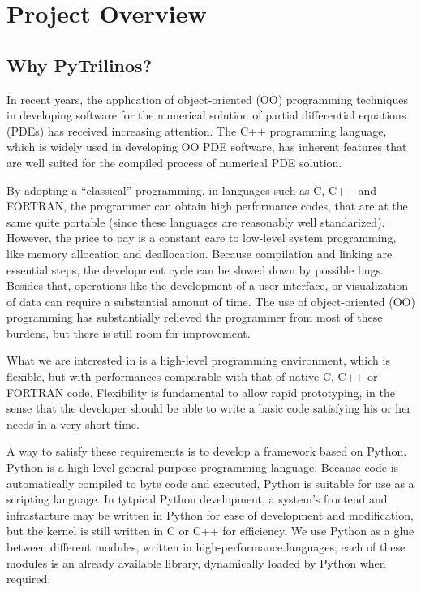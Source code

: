 \documentclass[10pt,relax]{SANDreport}
\newcommand{\PyTrilinos}{{PyTrilinos}}
\begin{document}
\section{Project Overview}
\label{sec:overview}

\subsection{Why \PyTrilinos?}
\label{sec:why}

In recent years, the application of object-oriented (OO) programming
techniques in developing software for the numerical solution of partial
differential equations (PDEs) has received increasing attention. The C++
programming language, which is widely used in developing OO PDE software, has
inherent features that are well suited for the compiled process of numerical
PDE solution.

By adopting a ``classical'' programming, in languages such as C, C++ and
FORTRAN, the programmer can  obtain high performance codes, that are at the
same quite portable (since these languages are reasonably well standarized).
However, the price to pay is a constant care to low-level system programming,
like memory allocation and deallocation. Because compilation and linking are
essential steps, the development cycle can be slowed down by possible bugs.
Besides that, operations like the development of a user interface, or
visualization of data can require a substantial amount of time. The use of
object-oriented (OO) programming has substantially relieved the programmer
from most of these burdens, but there is still room for improvement.

What we are interested in is a high-level programming environment, which 
is flexible, but with performances comparable with that of native C, C++ or
FORTRAN code. Flexibility is fundamental to allow rapid prototyping, in the
sense that the developer should be able to write a basic code satisfying his
or her needs in a very short time. 

A way to satisfy these requirements is to develop a framework based on Python.
Python is a high-level general purpose programming language. Because code is
automatically compiled to byte code and executed, Python is suitable for use
as a scripting language. 
  In tytpical Python development, a system's frontend and infrastacture may be
  written in Python for ease of development and modification, but the kernel
  is still written in C or C++ for efficiency.
We use Python as a glue between different
  modules, written in high-performance languages; each of these modules is an
  already available library, dynamically loaded by Python when required.
\end{document}
